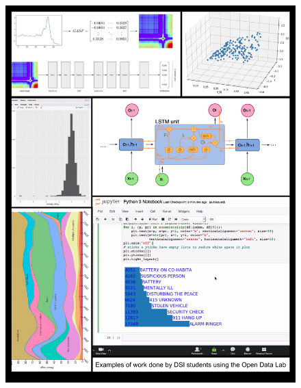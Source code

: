 \documentclass[12pt,letterpaper]{book} %
\begin{document}
\cleardoublepage
\begin{figure}[!hbtp]
\includegraphics[width=\textwidth]{cover-images/ODLBackCover-neat}
\end{figure}
\end{document}

